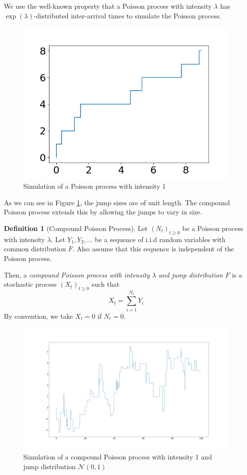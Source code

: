 \documentclass[a4paper,11pt]{article}
\theoremstyle{theorem}
\theoremstyle{definition}
\newtheorem{defn}{Definition}[section]
\theoremstyle{remark}
\begin{document}
We use the well-known property that a Poisson process with intensity $\lambda$ has $\exp(\lambda)$-distributed inter-arrival times to simulate the Poisson process.

\begin{figure}[h!]
\centering
\includegraphics[scale=0.5]{poisprocess.png}
\caption{Simulation of a Poisson process with intensity 1}
\label{poisprocess}
\end{figure}

As we can see in Figure \ref{poisprocess}, the jump sizes are of unit length. The compound Poisson process extends this by allowing the jumps to vary in size.

\begin{defn}[Compound Poisson Process]
Let $(N_{t})_{t \geq 0}$ be a Poisson process with intensity $\lambda$. Let $Y_{1}, Y_{2}, \dotsc$ be a sequence of i.i.d random variables with common distribution $F$. Also assume that this sequence is independent of the Poisson process.

Then, a \textit{compound Poisson process with intensity $\lambda$ and jump distribution $F$} is a stochastic process $(X_{t})_{t \geq 0}$ such that
\[
X_{t} = \sum_{i=1}^{N_t} Y_{i}
\]
By convention, we take $X_t = 0$ if $N_t = 0$.
\end{defn}

\begin{figure}[h]
\centering
\includegraphics[scale=0.1]{cppsim.png}
\caption{Simulation of a compound Poisson process with intensity 1 and jump distribution $\mathcal{N}(0,1)$}
\label{cppsim}
\end{figure}
\end{document}
